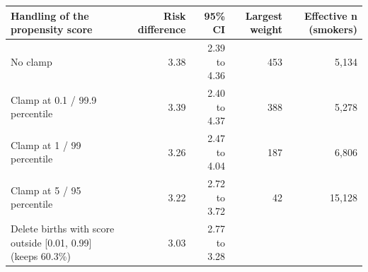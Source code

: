 {\small
\begin{tabular}{p{6.2cm}rrrr}
\toprule
Handling of the propensity score & Risk difference & 95\% CI & Largest weight & Effective n (smokers) \\
\midrule
No clamp & 3.38 & 2.39 to 4.36 & 453 & 5,134 \\
Clamp at 0.1 / 99.9 percentile & 3.39 & 2.40 to 4.37 & 388 & 5,278 \\
Clamp at 1 / 99 percentile & 3.26 & 2.47 to 4.04 & 187 & 6,806 \\
Clamp at 5 / 95 percentile & 3.22 & 2.72 to 3.72 & 42 & 15,128 \\
Delete births with score outside [0.01, 0.99] (keeps 60.3\%) & 3.03 & 2.77 to 3.28 &  &  \\
\bottomrule
\end{tabular}
}
